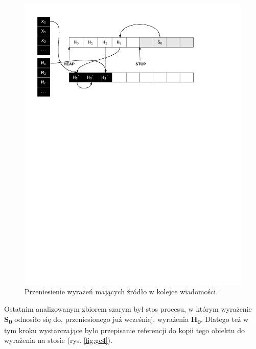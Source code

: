 \begin{figure}[h]
\centerline{\includegraphics[scale=0.75, clip, trim=10mm 185mm 45mm 10mm]{gc_3}}
\caption{Przeniesienie wyrażeń mających źródło w kolejce wiadomości.}
\label{fig:gc3}
\end{figure}

Ostatnim analizowanym zbiorem szarym był stos procesu, w którym wyrażenie \textbf{S\textsubscript{0}} odnosiło się do, przeniesionego już wcześniej, wyrażenia \textbf{H\textsubscript{0}}. Dlatego też w tym kroku wystarczające było przepisanie referencji do kopii tego obiektu do wyrażenia na stosie (rys. \ref{fig:gc4}).

